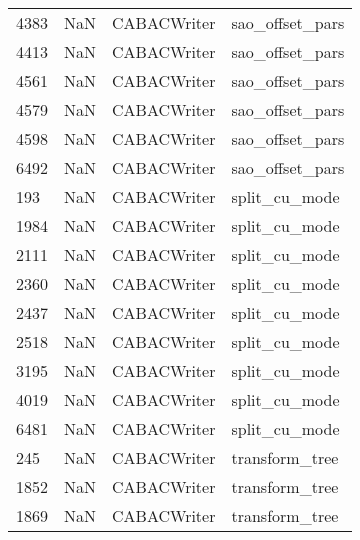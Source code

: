 \begin{tabular}{llll}
4383 &                   NaN &                CABACWriter &                           sao\_offset\_pars \\
4413 &                   NaN &                CABACWriter &                           sao\_offset\_pars \\
4561 &                   NaN &                CABACWriter &                           sao\_offset\_pars \\
4579 &                   NaN &                CABACWriter &                           sao\_offset\_pars \\
4598 &                   NaN &                CABACWriter &                           sao\_offset\_pars \\
6492 &                   NaN &                CABACWriter &                           sao\_offset\_pars \\
193  &                   NaN &                CABACWriter &                             split\_cu\_mode \\
1984 &                   NaN &                CABACWriter &                             split\_cu\_mode \\
2111 &                   NaN &                CABACWriter &                             split\_cu\_mode \\
2360 &                   NaN &                CABACWriter &                             split\_cu\_mode \\
2437 &                   NaN &                CABACWriter &                             split\_cu\_mode \\
2518 &                   NaN &                CABACWriter &                             split\_cu\_mode \\
3195 &                   NaN &                CABACWriter &                             split\_cu\_mode \\
4019 &                   NaN &                CABACWriter &                             split\_cu\_mode \\
6481 &                   NaN &                CABACWriter &                             split\_cu\_mode \\
245  &                   NaN &                CABACWriter &                            transform\_tree \\
1852 &                   NaN &                CABACWriter &                            transform\_tree \\
1869 &                   NaN &                CABACWriter &                            transform\_tree \\

\end{tabular}
